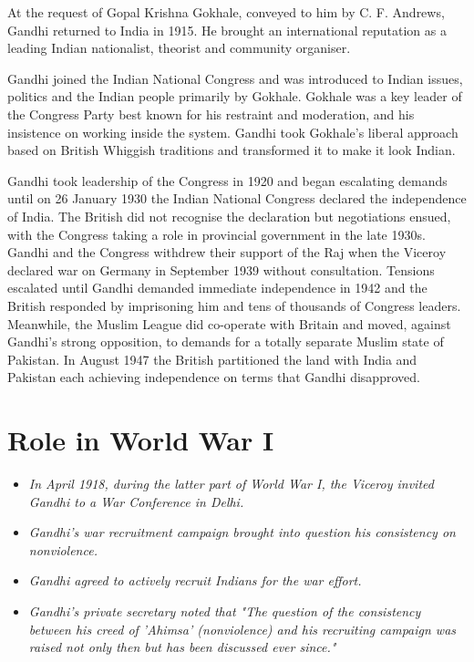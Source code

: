 At the request of Gopal Krishna Gokhale, conveyed to him by C. F.
Andrews, Gandhi returned to India in 1915. He brought an international
reputation as a leading Indian nationalist, theorist and community
organiser.

Gandhi joined the Indian National Congress and was introduced to Indian
issues, politics and the Indian people primarily by Gokhale. Gokhale was
a key leader of the Congress Party best known for his restraint and
moderation, and his insistence on working inside the system. Gandhi took
Gokhale's liberal approach based on British Whiggish traditions and
transformed it to make it look Indian.

Gandhi took leadership of the Congress in 1920 and began escalating
demands until on 26 January 1930 the Indian National Congress declared
the independence of India. The British did not recognise the declaration
but negotiations ensued, with the Congress taking a role in provincial
government in the late 1930s. Gandhi and the Congress withdrew their
support of the Raj when the Viceroy declared war on Germany in September
1939 without consultation. Tensions escalated until Gandhi demanded
immediate independence in 1942 and the British responded by imprisoning
him and tens of thousands of Congress leaders. Meanwhile, the Muslim
League did co-operate with Britain and moved, against Gandhi's strong
opposition, to demands for a totally separate Muslim state of Pakistan.
In August 1947 the British partitioned the land with India and Pakistan
each achieving independence on terms that Gandhi disapproved.

\section{Role in World War I}\label{role-in-world-war-i}

\begin{itemize}
\item
  \emph{In April 1918, during the latter part of World War I, the
  Viceroy invited Gandhi to a War Conference in Delhi.}
\item
  \emph{Gandhi's war recruitment campaign brought into question his
  consistency on nonviolence.}
\item
  \emph{Gandhi agreed to actively recruit Indians for the war effort.}
\item
  \emph{Gandhi's private secretary noted that "The question of the
  consistency between his creed of 'Ahimsa' (nonviolence) and his
  recruiting campaign was raised not only then but has been discussed
  ever since."}
\end{itemize}


